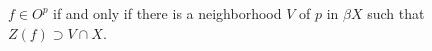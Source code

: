 $f \in O^p$ if and only if there is a neighborhood $V$ of $p$ in $\beta X$ such that $Z(f) \supset V \cap X$.
